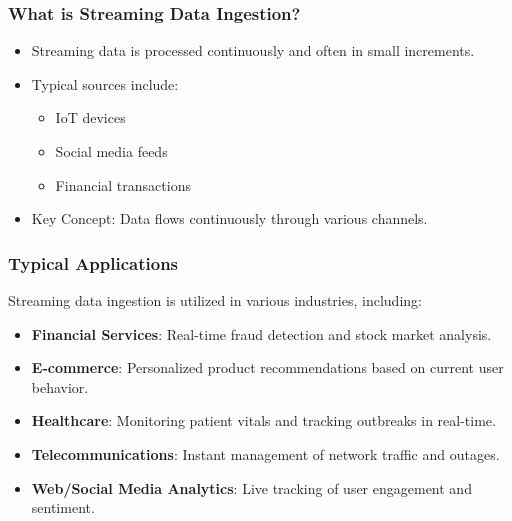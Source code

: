 \documentclass[aspectratio=169]{beamer}
\begin{document}
\begin{frame}[fragile]
    \frametitle{What is Streaming Data Ingestion?}
    \begin{itemize}
        \item Streaming data is processed continuously and often in small increments.
        \item Typical sources include:
        \begin{itemize}
            \item IoT devices
            \item Social media feeds
            \item Financial transactions
        \end{itemize}
        \item Key Concept: Data flows continuously through various channels.
    \end{itemize}
\end{frame}

\begin{frame}[fragile]
    \frametitle{Typical Applications}
    Streaming data ingestion is utilized in various industries, including:
    \begin{itemize}
        \item \textbf{Financial Services}: Real-time fraud detection and stock market analysis.
        \item \textbf{E-commerce}: Personalized product recommendations based on current user behavior.
        \item \textbf{Healthcare}: Monitoring patient vitals and tracking outbreaks in real-time.
        \item \textbf{Telecommunications}: Instant management of network traffic and outages.
        \item \textbf{Web/Social Media Analytics}: Live tracking of user engagement and sentiment.
    \end{itemize}
\end{frame}
\end{document}
